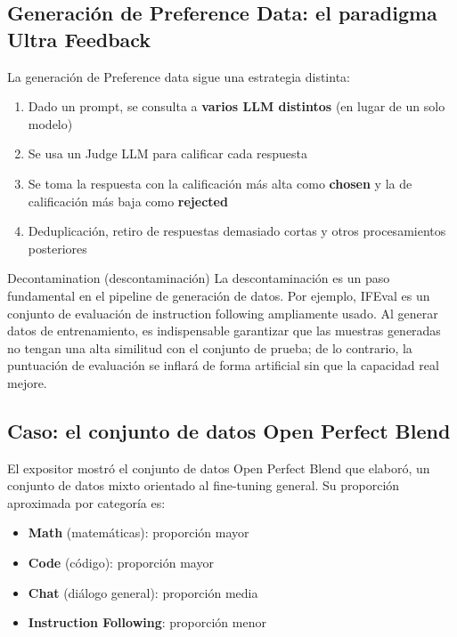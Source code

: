 \subsection{Generación de Preference Data: el paradigma Ultra Feedback}

La generación de Preference data sigue una estrategia distinta:

\begin{enumerate}
    \item Dado un prompt, se consulta a \textbf{varios LLM distintos} (en lugar de un solo modelo)
    \item Se usa un Judge LLM para calificar cada respuesta
    \item Se toma la respuesta con la calificación más alta como \textbf{chosen} y la de calificación más baja como \textbf{rejected}
    \item Deduplicación, retiro de respuestas demasiado cortas y otros procesamientos posteriores
\end{enumerate}

\begin{knowledgebox}{Decontamination (descontaminación)}
La descontaminación es un paso fundamental en el pipeline de generación de datos. Por ejemplo, IFEval es un conjunto de evaluación de instruction following ampliamente usado. Al generar datos de entrenamiento, es indispensable garantizar que las muestras generadas no tengan una alta similitud con el conjunto de prueba; de lo contrario, la puntuación de evaluación se inflará de forma artificial sin que la capacidad real mejore.
\end{knowledgebox}

\subsection{Caso: el conjunto de datos Open Perfect Blend}

El expositor mostró el conjunto de datos Open Perfect Blend que elaboró, un conjunto de datos mixto orientado al fine-tuning general. Su proporción aproximada por categoría es:

\begin{itemize}
    \item \textbf{Math} (matemáticas): proporción mayor
    \item \textbf{Code} (código): proporción mayor
    \item \textbf{Chat} (diálogo general): proporción media
    \item \textbf{Instruction Following}: proporción menor
\end{itemize}


